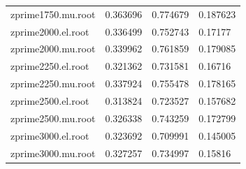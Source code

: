 \begin{table}[H]
\begin{tabular}{l|lll}
  zprime1750.mu.root & 0.363696    & 0.774679  &    0.187623         \\
  zprime2000.el.root & 0.336499    & 0.752743  &    0.17177         \\
  zprime2000.mu.root & 0.339962    & 0.761859  &    0.179085          \\
  zprime2250.el.root & 0.321362    & 0.731581  &    0.16716          \\
  zprime2250.mu.root & 0.337924    & 0.755478  &    0.178165         \\
  zprime2500.el.root & 0.313824    & 0.723527  &    0.157682         \\
  zprime2500.mu.root & 0.326338    & 0.743259  &    0.172799         \\
  zprime3000.el.root & 0.323692    & 0.709991  &    0.145005         \\
  zprime3000.mu.root & 0.327257    & 0.734997  &    0.15816
\end{tabular}
\label{tab:eff_b}

\end{table}




